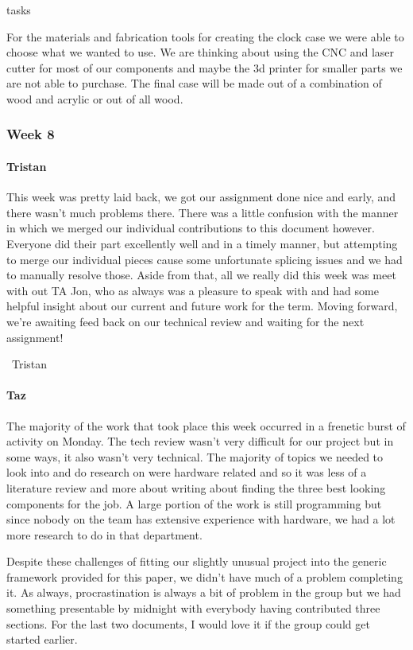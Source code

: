 tasks\documentclass[onecolumn, draftclsnofoot,10pt, compsoc]{IEEEtran}
\begin{document}
For the materials and fabrication tools for creating the clock case we were able to choose what we wanted to use. We are thinking about using the CNC and laser cutter for most of our components and maybe the 3d printer for smaller parts we are not able to purchase. The final case will be made out of a combination of wood and acrylic or out of all wood.
\subsubsection{Week 8}
\paragraph{Tristan}
This week was pretty laid back, we got our assignment done nice and early, and there wasn't much problems there. There was a little confusion with the manner in which we merged our individual contributions to this document however. Everyone did their part excellently well and in a timely manner, but attempting to merge our individual pieces cause some unfortunate splicing issues and we had to manually resolve those. Aside from that, all we really did this week was meet with out TA Jon, who as always was a pleasure to speak with and had some helpful insight about our current and future work for the term. Moving forward, we're awaiting feed back on our technical review and waiting for the next assignment!

~Tristan
\paragraph{Taz}
The majority of the work that took place this week occurred in a frenetic burst of activity on Monday. The tech review wasn't very difficult for our project but in some ways, it also wasn't very technical. The majority of topics we needed to look into and do research on were hardware related and so it was less of a literature review and more about writing about finding the three best looking components for the job. A large portion of the work is still programming but since nobody on the team has extensive experience with hardware, we had a lot more research to do in that department.

Despite these challenges of fitting our slightly unusual project into the generic framework provided for this paper, we didn't have much of a problem completing it. As always, procrastination is always a bit of problem in the group but we had something presentable by midnight with everybody having contributed three sections. For the last two documents, I would love it if the group could get started earlier.
\end{document}
